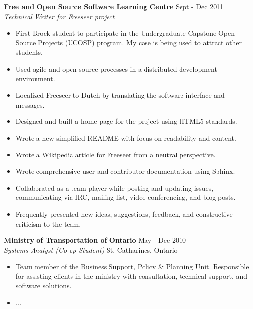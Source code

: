 \documentclass[margin]{res}
\begin{document}
\begin{resume}
	\textbf{Free and Open Source Software Learning Centre} \hfill Sept - Dec 2011 \\
    {\sl Technical Writer for Freeseer project} \hfill %
	\begin{itemize}  \itemsep -2pt %
	  \item First Brock student to participate in the Undergraduate Capstone Open Source Projects
	  (UCOSP) program. My case is being used to attract other students.
	  \item Used agile and open source processes in a distributed development environment.
	  \item Localized Freeseer to Dutch by translating the software interface and messages.
	  \item Designed and built a home page for the project using HTML5 standards.
    \item Wrote a new simplified README with focus on readability and content.
	  \item Wrote a Wikipedia article for Freeseer from a neutral perspective.
	  \item Wrote comprehensive user and contributor documentation using Sphinx.
	  \item Collaborated as a team player while posting and updating issues,
	  communicating via IRC, mailing list, video conferencing, and blog posts.
	  \item Frequently presented new ideas, suggestions, feedback, and constructive criticism to the team.
	\end{itemize}

	\textbf{Ministry of Transportation of Ontario} \hfill May - Dec 2010 \\
    {\sl Systems Analyst (Co-op Student)} \hfill St. Catharines, Ontario %
	\begin{itemize}  \itemsep -2pt %
	  \item Team member of the Business Support, Policy \& Planning Unit.
	  Responsible for assisting clients in the ministry with consultation, technical support,
	  and software solutions.
	  \item ...
	\end{itemize}

%


\end{resume}
\end{document}
